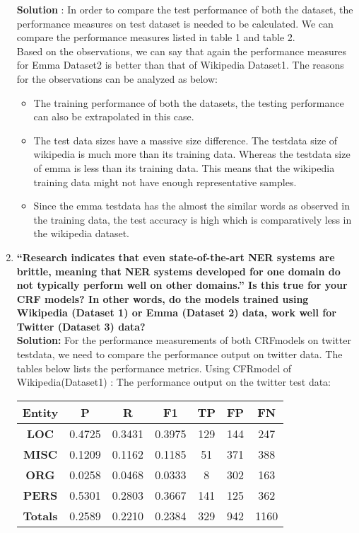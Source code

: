 \documentclass[12pt]{article}
\begin{document}
\begin{enumerate}
\textbf{Solution} : In order to compare the test performance of both the dataset, the performance measures on test dataset is needed to be calculated. We can compare the performance measures listed in table 1 and table 2. \\
Based on the observations, we can say that again the performance measures for Emma Dataset2 is better than that of Wikipedia Dataset1. The reasons for the observations can be analyzed as below:
\begin{itemize}
\item The training performance of both the datasets, the testing performance can also be extrapolated in this case.
\item The test data sizes have a massive size difference. The testdata size of wikipedia is much more than its training data. Whereas the testdata size of emma is less than its training data. This means that the wikipedia training data might not have enough representative samples.
\item Since the emma testdata has the almost the similar words as observed in the training data, the test accuracy is high which is comparatively less in the wikipedia dataset.\\
\end{itemize}


\item \textbf{“Research indicates that even state-of-the-art NER systems are brittle, meaning that NER systems developed for one domain do not typically perform well on other domains.” Is this true for your CRF models? In other words, do the models trained using Wikipedia (Dataset 1) or Emma (Dataset 2) data, work well for Twitter (Dataset 3) data?}\\

\textbf{Solution:} For the performance measurements of both CRFmodels on twitter testdata, we need to compare the performance output on twitter data. The tables below lists the performance metrics.
Using CFRmodel of Wikipedia(Dataset1) : The performance output on the twitter test data:\\


\begin{table}[ht!]
\centering
\begin{tabular}{ |c|c|c|c|c|c|c|} 
\hline 
\textbf{Entity} & \textbf{P} & \textbf{R} & \textbf{F1} &\textbf{TP} &\textbf{FP} & \textbf{FN} \\ [2ex]
\hline 
\textbf{LOC} & 0.4725 & 0.3431 & 0.3975 & 129 & 144 & 247\\ [1ex]
\hline 
\textbf{MISC} & 0.1209 & 0.1162 & 0.1185 &51 & 371 & 388\\ [1ex]
\hline
\textbf{ORG} & 0.0258 & 0.0468 & 0.0333  & 8 & 302 & 163\\  [1ex]
\hline
\textbf{PERS} & 0.5301 & 0.2803 & 0.3667 & 141 & 125 & 362\\ [1ex]
\hline
\textbf{Totals} & 0.2589 & 0.2210 & 0.2384 & 329 & 942 & 1160 \\  [1ex]


\end{tabular}
\end{table}
\end{enumerate}
\end{document}
